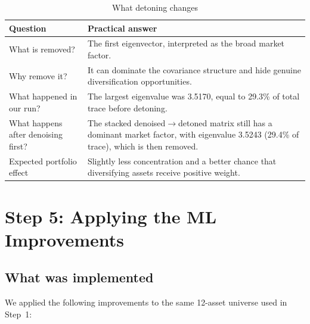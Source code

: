 \documentclass[11pt,a4paper]{article}
\begin{document}
\begin{table}[H]
\centering
\caption{What detoning changes}
\label{tab:detone_summary}
{\small\setlength{\tabcolsep}{4pt}\renewcommand{\arraystretch}{1.15}\begin{tabularx}{\textwidth}{>{\raggedright\arraybackslash}p{3.6cm} X}
\toprule
Question & Practical answer \\
\midrule
What is removed? & The first eigenvector, interpreted as the broad market factor. \\
Why remove it? & It can dominate the covariance structure and hide genuine diversification opportunities. \\
What happened in our run? & The largest eigenvalue was 3.5170, equal to 29.3\% of total trace before detoning. \\
What happens after denoising first? & The stacked denoised$\rightarrow$detoned matrix still has a dominant market factor, with eigenvalue 3.5243 (29.4\% of trace), which is then removed. \\
Expected portfolio effect & Slightly less concentration and a better chance that diversifying assets receive positive weight. \\
\bottomrule
\end{tabularx}}
\end{table}

\section{Step 5: Applying the ML Improvements}

\subsection{What was implemented}
We applied the following improvements to the
same 12-asset universe used in Step~1:
\end{document}
